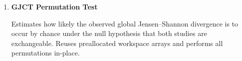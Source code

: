 \begin{enumerate}
        \begin{lstlisting}[caption={GJCT Permutation Test (Allocated)}]
call gjct_permutation_test_alloc(neighborhood_residuals_S1, neighborhood_residuals_S2, &
    n_reps_S1, n_reps_S2, n_neighbors, n_points, global_jsd_observed, n_bins, &
    shared_residual_range, n_permutations, jsd_null, p_value, ierr, random_seed, &
    neighbor_mask_S1, neighbor_mask_S2)
        \end{lstlisting}

    \item \textbf{GJCT Permutation Test}

        Estimates how likely the observed global Jensen–Shannon divergence is to occur by chance under the null hypothesis that both studies are exchangeable.  
        Reuses preallocated workspace arrays and performs all permutations in-place.


\end{enumerate}
